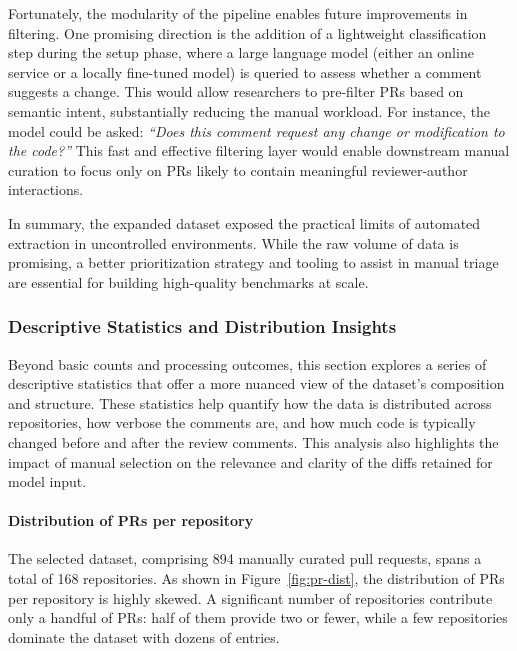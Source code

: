 Fortunately, the modularity of the pipeline enables future improvements in filtering. One promising
direction is the addition of a lightweight classification step during the setup phase, where a large
language model (either an online service or a locally fine-tuned model) is queried to assess whether
a comment suggests a change. This would allow researchers to pre-filter PRs based on semantic
intent, substantially reducing the manual workload. For instance, the model could be asked:
\textit{``Does this comment request any change or modification to the code?''} This fast and
effective filtering layer would enable downstream manual curation to focus only on PRs likely to
contain meaningful reviewer-author interactions.

In summary, the expanded dataset exposed the practical limits of automated extraction in
uncontrolled environments. While the raw volume of data is promising, a better prioritization
strategy and tooling to assist in manual triage are essential for building high-quality
benchmarks at scale.


\subsubsection{Descriptive Statistics and Distribution Insights}

Beyond basic counts and processing outcomes, this section explores a series of descriptive
statistics that offer a more nuanced view of the dataset’s composition and structure. These
statistics help quantify how the data is distributed across repositories, how verbose the comments
are, and how much code is typically changed before and after the review comments. This analysis also
highlights the impact of manual selection on the relevance and clarity of the diffs retained for
model input.

\paragraph{Distribution of PRs per repository}
The selected dataset, comprising 894 manually curated pull requests, spans a total of 168
repositories. As shown in Figure~\ref{fig:pr-dist}, the distribution of PRs per repository is highly
skewed. A significant number of repositories contribute only a handful of PRs: half of them provide
two or fewer, while a few repositories dominate the dataset with dozens of entries.

